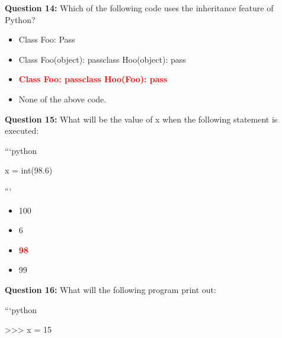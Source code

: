 \documentclass[12pt,a4paper]{article}
\begin{document}
\vspace{0.5cm}

\textbf{Question 14:} Which of the following code uses the inheritance feature of Python?

\begin{itemize}
    \item[\textbf{A.}] Class Foo: Pass
    \item[\textbf{B.}] Class Foo(object): passclass Hoo(object): pass
    \item[\textbf{C.}] \textcolor{red}{\textbf{Class Foo: passclass Hoo(Foo): pass}}
    \item[\textbf{D.}] None of the above code.
\end{itemize}

\vspace{0.5cm}

\textbf{Question 15:} What will be the value of x when the following statement is executed:\newline

\newline
\newline

\newline
```python\newline

\newline
x = int(98.6)\newline

\newline
```

\begin{itemize}
    \item[\textbf{A.}] 100
    \item[\textbf{B.}] 6
    \item[\textbf{C.}] \textcolor{red}{\textbf{98}}
    \item[\textbf{D.}] 99
\end{itemize}

\vspace{0.5cm}

\textbf{Question 16:} What will the following program print out:\newline

\newline
\newline

\newline
```python\newline

\newline
>>> x = 15\newline
\end{document}
